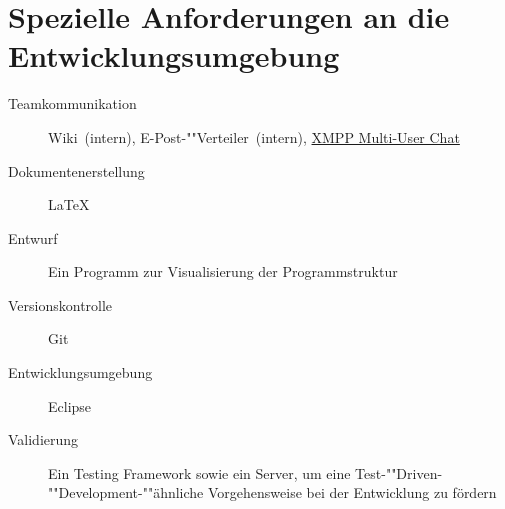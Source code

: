 \section{Spezielle Anforderungen an die Entwicklungsumgebung}%

\begin{description}%
    \item [Teamkommunikation] Wiki~(intern), E-Post-""Verteiler~(intern), \href{http://xmpp.org/extensions/xep-0045.html}{XMPP Multi-User Chat}
    \item [Dokumentenerstellung] \LaTeX{}%
    \item [Entwurf] Ein Programm zur Visualisierung der Programmstruktur
    \item [Versionskontrolle] Git%
    \item [Entwicklungsumgebung] Eclipse%
    \item [Validierung] Ein Testing Framework sowie ein  Server, um eine Test-""Driven-""Development-""ähnliche Vorgehensweise bei der Entwicklung zu fördern
\end{description}%
